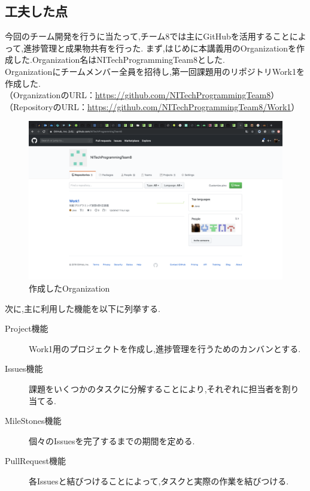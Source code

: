 \documentclass[uplatex,12pt]{jsarticle}
\begin{document}
\subsection{工夫した点}
今回のチーム開発を行うに当たって,チーム8では主にGitHubを活用することによって,進捗管理と成果物共有を行った.
まず,はじめに本講義用のOrganizationを作成した.Organization名はNITechProgrammingTeam8とした. \\
Organizationにチームメンバー全員を招待し,第一回課題用のリポジトリWork1を作成した. \\
（OrganizationのURL：\url{https://github.com/NITechProgrammingTeam8}）\\
（RepositoryのURL：\url{https://github.com/NITechProgrammingTeam8/Work1}）

\begin{figure}[!hbt]
  \centering
  \includegraphics[scale=0.20]{git_image/organization_image.png}
  \caption{作成したOrganization}
\end{figure}

\newpage

次に,主に利用した機能を以下に列挙する. \\
\begin{description}
  \item[Project機能] Work1用のプロジェクトを作成し,進捗管理を行うためのカンバンとする.
  \item[Issues機能] 課題をいくつかのタスクに分解することにより,それぞれに担当者を割り当てる.
  \item[MileStones機能] 個々のIssuesを完了するまでの期間を定める.
  \item[PullRequest機能] 各Issuesと結びつけることによって,タスクと実際の作業を結びつける.
\end{description}
\end{document}
